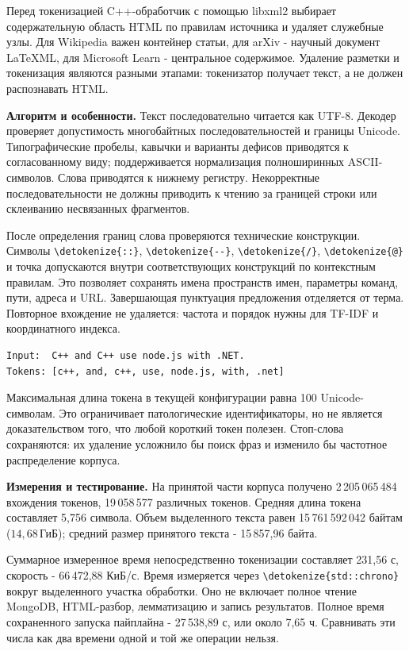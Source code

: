 \documentclass[pdf,unicode,12pt,a4paper,oneside,fleqn]{article}
\newcommand{\partlabel}[1]{\par\Needspace{4\baselineskip}\medskip\textbf{#1.}\quad}
\DeclareRobustCommand{\code}[1]{\expandafter\nolinkurl\expandafter{\detokenize{#1}}}
\newcommand{\GiB}{\,\text{ГиБ}}
\begin{document}
Перед токенизацией C++-обработчик с помощью libxml2 выбирает содержательную
область HTML по правилам источника и удаляет служебные узлы. Для Wikipedia
важен контейнер статьи, для arXiv - научный документ LaTeXML, для Microsoft
Learn - центральное содержимое. Удаление разметки и токенизация являются
разными этапами: токенизатор получает текст, а не должен распознавать HTML.

\partlabel{Алгоритм и особенности}
Текст последовательно читается как UTF-8. Декодер проверяет допустимость
многобайтных последовательностей и границы Unicode. Типографические пробелы,
кавычки и варианты дефисов приводятся к согласованному виду; поддерживается
нормализация полноширинных ASCII-символов. Слова приводятся к нижнему регистру.
Некорректные последовательности не должны приводить к чтению за границей
строки или склеиванию несвязанных фрагментов.

После определения границ слова проверяются технические конструкции.
Символы \code{::}, \code{--}, \code{/}, \code{@} и точка допускаются внутри
соответствующих конструкций по контекстным правилам. Это позволяет сохранять
имена пространств имен, параметры команд, пути, адреса и URL. Завершающая
пунктуация предложения отделяется от терма. Повторное вхождение не удаляется:
частота и порядок нужны для TF-IDF и координатного индекса.

\begin{lstlisting}
Input:  C++ and C++ use node.js with .NET.
Tokens: [c++, and, c++, use, node.js, with, .net]
\end{lstlisting}

Максимальная длина токена в текущей конфигурации равна 100 Unicode-символам.
Это ограничивает патологические идентификаторы, но не является доказательством
того, что любой короткий токен полезен. Стоп-слова сохраняются: их удаление
усложнило бы поиск фраз и изменило бы частотное распределение корпуса.

\partlabel{Измерения и тестирование}
На принятой части корпуса получено 2\,205\,065\,484 вхождения токенов,
19\,058\,577 различных токенов. Средняя длина токена составляет 5,756 символа.
Объем выделенного текста равен 15\,761\,592\,042 байтам
($14{,}68\GiB$); средний размер принятого текста - 15\,857,96 байта.

Суммарное измеренное время непосредственно токенизации составляет 231,56 с,
скорость - 66\,472,88 КиБ/с. Время измеряется через \code{std::chrono} вокруг
выделенного участка обработки. Оно не включает полное чтение MongoDB,
HTML-разбор, лемматизацию и запись результатов. Полное время сохраненного
запуска пайплайна - 27\,538,89 с, или около 7,65 ч. Сравнивать эти числа
как два времени одной и той же операции нельзя.
\end{document}
